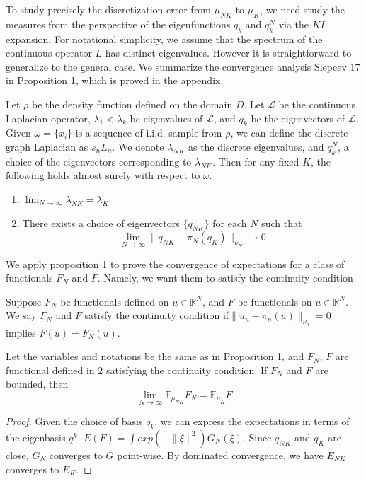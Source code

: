\documentclass[final]{siamart0516}
\newcommand{\cL}{\mathcal{L}}
\newcommand{\bbE}{\mathbb{E}}
\begin{document}
To study precisely the discretization error from $\mu_{NK}$ to $\mu_K$, we need study the measures from the perspective of the eigenfunctions $q_k$ and $q_k^N$ via the $KL$ expansion. For notational simplicity, we assume that the spectrum of the continuous operator $L$ has distinct eigenvalues. However it is straightforward to generalize to the general case. We summarize the convergence analysis Slepcev 17 in Proposition 1, which is proved in the appendix. 
\begin{proposition}
Let $\rho$ be the density function defined on the domain $D$.  Let $\cL$ be the continuous Laplacian operator,  $\lambda_1 < \lambda_k$ be eigenvalues of $\cL$, and $q_k$ be the eigenvectors of $\cL$.    Given $\omega = \{x_i\}$ is a sequence of i.i.d. sample from $\rho$, we can define the discrete graph Laplacian as $s_n L_n$. We denote $\lambda_{NK}$ as the discrete eigenvalues, and $q_k^N$, a choice of the eigenvectors corresponding to $\lambda_{NK}$.  Then for any fixed $K$, the following holds almost surely with respect to $\omega$. 
\begin{enumerate}
\item $\lim_{N\rightarrow \infty} \lambda_{NK} = \lambda_K$
\item There exists a choice of eigenvectors $\{q_{NK}\}$  for each $N$ such that $$\lim_{N\rightarrow \infty}\|q_{NK} - \pi_N(q_{K})\|_{\nu_N} \rightarrow 0$$
\end{enumerate} 
\end{proposition}

We apply proposition 1 to prove the convergence of expectations for a class of functionals $F_N$ and $F$.  Namely, we want them to satisfy the continuity condition 
\begin{definition}
Suppose $F_N$ be functionals defined on $u\in \mathbb{R}^N$, and $F$ be functionals on $u\in \mathbb{R}^N$. We say $F_N$ and $F$ satisfy the continuity condition if$\|u_n - \pi_n(u) \|_{\nu_n} = 0$ implies $F(u) = F_N(u)$.  
\end{definition}
\begin{proposition}
Let the variables and notations be the same as in Proposition 1, and $F_N$, $F$ are functional defined in 2 satisfying the continuity condition. If $F_N$ and $F$ are bounded, then $$\lim_{N\rightarrow \infty} \bbE_{\mu_{NK}} F_N  = \bbE_{\mu_{K}} F$$
\end{proposition}
\begin{proof}
Given the choice of basis $q_k$, we can express the expectations in terms of the eigenbasis $q^k$. $E(F) = \int exp(-\| \xi \|^2) G_N(\xi)$. Since $q_{NK}$ and $q_K$ are close, $G_N$ converges to $G$ point-wise. By dominated convergence, we have $E_{NK}$ converges to $E_K$. 
\end{proof}
\end{document}
